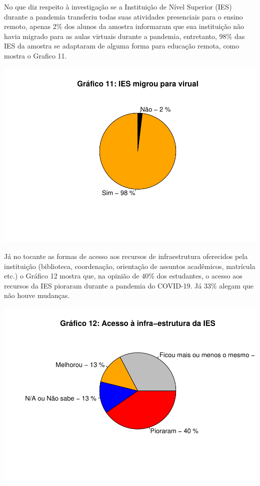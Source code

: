 \documentclass[
]{article}
\begin{document}
No que diz respeito à investigação se a Instituição de Nível Superior
(IES) durante a pandemia transferiu todas suas atividades presenciais
para o ensino remoto, apenas 2\% dos alunos da amostra informaram que
sua instituição não havia migrado para as aulas virtuais durante a
pandemia, entretanto, 98\% das IES da amostra se adaptaram de alguma
forma para educação remota, como mostra o Grafico 11.

\includegraphics{consequencias-oriundas-da-pandemia-v1.0_files/figure-latex/grafico-11-1.pdf}

Já no tocante as formas de acesso aos recursos de infraestrutura
oferecidos pela instituição (biblioteca, coordenação, orientação de
assuntos acadêmicos, matrícula etc.) o Gráfico 12 mostra que, na opinião
de 40\% dos estudantes, o acesso aos recursos da IES pioraram durante a
pandemia do COVID-19. Já 33\% alegam que não houve mudanças.

\includegraphics{consequencias-oriundas-da-pandemia-v1.0_files/figure-latex/grafico-12-1.pdf}
\end{document}
